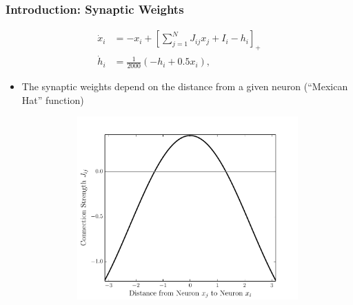 \documentclass{beamer}
\begin{document}
\begin{frame}
\frametitle{Introduction: Synaptic Weights}
\vspace{-.25in}
\begin{equation*}
\begin{split}
 \dot x_i &= -x_i + \left[ \sum_{j=1}^N J_{ij} x_j + I_i - h_i \right]_+\\
 \dot h_i &= \frac{1}{2000}(-h_i + 0.5 x_i),
\end{split}
\end{equation*}
\begin{itemize}
\vspace{-.15in}
 \item The synaptic weights depend on the distance from a given neuron (``Mexican Hat'' function)
\begin{figure}
 \centering
 \begin{subfigure}[t]{0.4\textwidth}
                    \centering
                    \includegraphics[width=\linewidth]{kernel_itskov.pdf}
                \end{subfigure}
                \begin{subfigure}[t]{0.3\textwidth}
                    \centering

\end{subfigure}
\end{figure}
\end{itemize}
\end{frame}
\end{document}

